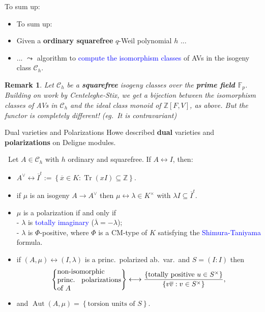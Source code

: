 \documentclass[usenames,dvipsnames]{beamer}
\def\Z{\mathbb{Z}}
\def\F{\mathbb{F}}
\DeclareMathOperator{\Aut}{Aut}
\DeclareMathOperator{\Tr}{Tr}
\newcommand{\cC}{{\mathcal C}}
\newcommand{\set}[1]{\left\lbrace#1\right\rbrace }
\newcommand{\blue}[1]{\textcolor{blue}{#1}}
\newtheorem{remark}[df]{Remark}
\begin{document}
\begin{frame}{ To sum up: }
    \begin{itemize}
    \item To sum up:
\pause
    \item Given a {\bf ordinary squarefree} $q$-Weil polynomial $h$ ...
\pause
    \item ... $\leadsto$ algorithm to \blue{compute the isomorphism classes} of AVs in the isogeny class $\cC_h$.
\end{itemize}
\pause    
    \begin{remark}
        Let $\cC_h$ be a {\bf squarefree} isogeny classes over the {\bf prime field $\F_p$}.
        Building on work by Centeleghe-Stix, we get a bijection between the isomorphism classes of AVs in $\cC_h$ and the ideal class monoid of $\Z[F,V]$, as above.
        But the functor is completely different! (eg.~It is contravariant)
    \end{remark}
\end{frame}


\begin{frame}{Dual varieties and Polarizations }
    Howe described \textbf{dual} varieties and \textbf{polarizations} on Deligne modules.
\pause
    \begin{theorem}\
    Let $A\in \cC_h$ with $h$ ordinary and squarefree. If $A\leftrightarrow I$, then:
    \begin{itemize}
\pause
    \item $A^\vee \leftrightarrow \overline{I}^t:=\set{ \overline{x} \in K : \Tr(xI)\subseteq \Z}$.
\pause
    \item if $\mu$ is an isogeny $A\to A^\vee$ then $\mu \leftrightarrow \lambda\in K^\times$ with
    $\lambda I \subseteq \overline{I}^t$.
\pause
    \item $\mu$ is a polarization if and only if\\
    - $\lambda$ is \blue{totally imaginary} ($\overline \lambda = -\lambda$);\\
    - $\lambda$ is $\Phi$-positive, where $\Phi$ is a CM-type of $K$ satisfying the \blue{Shimura-Taniyama} formula.\\ 
\pause
    \item if $(A,\mu) \leftrightarrow (I,\lambda)$ is a princ.~polarized ab.~var.~and $S=(I:I)$ then
    \vspace{-0.7em}
    \[\set{\parbox[p]{9em}{non-isomorphic princ. polarizations of $A$}} \longleftrightarrow \dfrac{\set{\text{totally positive }u\in S^\times }}{\set{v\overline{v}: v\in S^\times}},\]
    \vspace{-1.5em}
\pause
    \item  and $\Aut(A,\mu) = \set{\text{torsion units of $S$}}$.
    \end{itemize}
    \end{theorem}
\end{frame}
\end{document}
